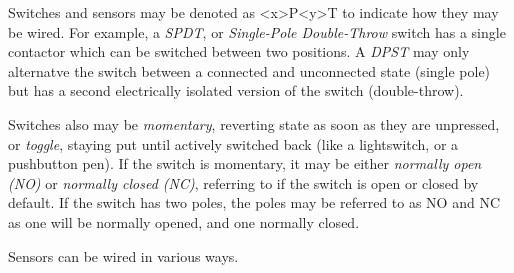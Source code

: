 Switches and sensors may be denoted as <x>P<y>T to indicate how they may be wired. For example, a \textit{SPDT}, or \textit{Single-Pole Double-Throw} switch has a single contactor which can be switched between two positions. A \textit{DPST} may only alternatve the switch between a connected and unconnected state (single pole) but has a second electrically isolated version of the switch (double-throw).

Switches also may be \textit{momentary}, reverting state as soon as they are unpressed, or \textit{toggle}, staying put until actively switched back (like a lightswitch, or a pushbutton pen). If the switch is momentary, it may be either \textit{normally open (NO)} or \textit{normally closed (NC)}, referring to if the switch is open or closed by default. If the switch has two poles, the poles may be referred to as NO and NC as one will be normally opened, and one normally closed.

Sensors can be wired in various ways.

